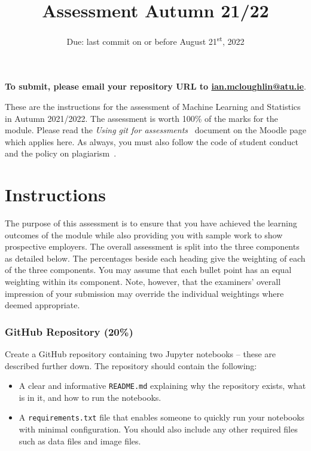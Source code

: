 \documentclass[a4paper, 12pt]{scrartcl}
\title{Assessment Autumn 21/22}
\author{}
\date{Due: last commit on or before August 21\textsuperscript{st}, 2022}
\begin{document}
  
  \maketitle
  
  \vspace{-12mm}
  \begin{center} \textbf{To submit, please email your repository URL to \url{ian.mcloughlin@atu.ie}}. \end{center}


  \noindent These are the instructions for the assessment of Machine Learning and Statistics in Autumn 2021/2022.
  The assessment is worth 100\% of the marks for the module.
  Please read the \emph{Using git for assessments}~\cite{usinggit} document on the Moodle page which applies here.
  As always, you must also follow the code of student conduct and the policy on plagiarism~\cite{gmitqaf}.

  \section*{Instructions}
  
  The purpose of this assessment is to ensure that you have achieved the learning outcomes of the module while also providing you with sample work to show prospective employers.
  The overall assessment is split into the three components as detailed below.
  The percentages beside each heading give the weighting of each of the three components.
  You may assume that each bullet point has an equal weighting within its component.
  Note, however, that the examiners' overall impression of your submission may override the individual weightings where deemed appropriate.
  
  \subsubsection*{GitHub Repository (20\%)}
  Create a GitHub repository containing two Jupyter notebooks -- these are described further down.
  The repository should contain the following:
  \begin{itemize}
    \item A clear and informative \texttt{README.md} explaining why the repository exists, what is in it, and how to run the notebooks.
    \item A \texttt{requirements.txt} file that enables someone to quickly run your notebooks with minimal configuration. You should also include any other required files such as data files and image files.
  \end{itemize}
\end{document}
